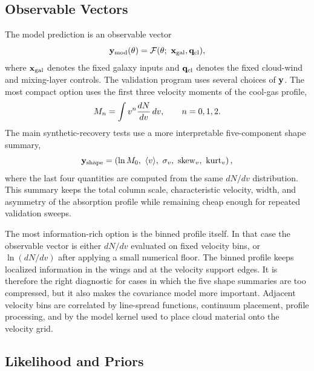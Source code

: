 \subsection{Observable Vectors}
\label{subsec:inference_observables}

The model prediction is an observable vector
\begin{equation}
{\bf y}_{\rm mod}(\theta)
=
{\cal F}(\theta;\ {\bf x}_{\rm gal}, {\bf q}_{\rm cl}),
\end{equation}
where ${\bf x}_{\rm gal}$ denotes the fixed galaxy inputs and
${\bf q}_{\rm cl}$ denotes the fixed cloud-wind and mixing-layer controls.  The
validation program uses several choices of ${\bf y}$.  The most compact option
uses the first three velocity moments of the cool-gas profile,
\begin{equation}
M_n = \int v^n {dN\over dv}\,dv,\qquad n=0,1,2 .
\end{equation}
The main synthetic-recovery tests use a more interpretable five-component shape
summary,
\begin{equation}
{\bf y}_{\rm shape}
=
\left(\ln M_0,\ \langle v\rangle,\ \sigma_v,\ {\rm skew}_v,\ {\rm kurt}_v\right),
\end{equation}
where the last four quantities are computed from the same $dN/dv$ distribution.
This summary keeps the total column scale, characteristic velocity, width, and
asymmetry of the absorption profile while remaining cheap enough for repeated
validation sweeps.

The most information-rich option is the binned profile itself.  In that case
the observable vector is either $dN/dv$ evaluated on fixed velocity bins, or
$\ln(dN/dv)$ after applying a small numerical floor.  The binned profile keeps
localized information in the wings and at the velocity support edges.  It is
therefore the right diagnostic for cases in which the five shape summaries are
too compressed, but it also makes the covariance model more important.  Adjacent
velocity bins are correlated by line-spread functions, continuum placement,
profile processing, and by the model kernel used to place cloud material onto
the velocity grid.

\subsection{Likelihood and Priors}
\label{subsec:inference_likelihood}

